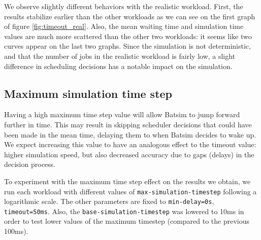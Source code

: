We observe slightly different behaviors with the realistic workload. First, the
results stabilize earlier than the other workloads as we can see on the first
graph of figure \ref{fig:timeout_real}. Also, the mean waiting time and
simulation time values are much more scattered than the other two workloads: it
seems like two curves appear on the last two graphs. Since the simulation is
not deterministic, and that the number of jobs in the realistic workload is
fairly low, a slight difference in scheduling decisions has a notable impact on
the simulation. 

\subsection{Maximum simulation time step}

Having a high maximum time step value will allow Batsim to jump forward further
in time. This may result in skipping scheduler decisions that could have been
made in the mean time, delaying them to when Batsim decides to wake up. We
expect increasing this value to have an analogous effect to the timeout value:
higher simulation speed, but also decreased accuracy due to gaps (delays) in
the decision process.

To experiment with the maximum time step effect on the results we obtain, we
run each workload with different values of \texttt{max-simulation-timestep}
following a logarithmic scale. The other parameters are fixed to
\texttt{min-delay=0s}, \texttt{timeout=50ms}. Also, the
\texttt{base-simulation-timestep} was lowered to 10ms in order to test lower
values of the maximum timestep (compared to the previous 100ms).

